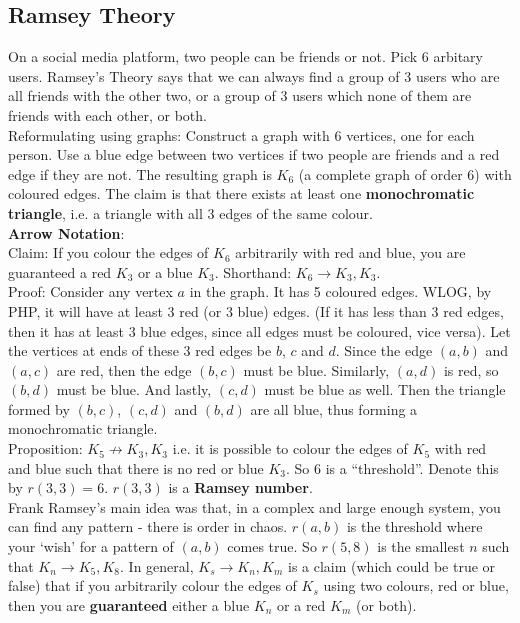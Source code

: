 \documentclass[12pt]{extarticle}
\begin{document}
\subsection*{Ramsey Theory}
On a social media platform, two people can be friends or not. Pick 6 arbitary users. Ramsey's Theory says that we can always find a group of 3 users who are all friends with the other two, or a group of 3 users which none of them are friends with each other, or both. \\
Reformulating using graphs: Construct a graph with 6 vertices, one for each person. Use a blue edge between two vertices if two people are friends and a red edge if they are not. The resulting graph is $K_6$ (a complete graph of order 6) with coloured edges. The claim is that there exists at least one \textbf{monochromatic triangle}, i.e. a triangle with all 3 edges of the same colour.\\
\textbf{Arrow Notation}:\\
Claim: If you colour the edges of $K_6$ arbitrarily with red and blue, you are guaranteed a red $K_3$ or a blue $K_3$. Shorthand: $K_6\to K_3,K_3$. \\
Proof: Consider any vertex $a$ in the graph. It has 5 coloured edges. WLOG, by PHP, it will have at least 3 red (or 3 blue) edges. (If it has less than 3 red edges, then it has at least 3 blue edges, since all edges must be coloured, vice versa). Let the vertices at ends of these 3 red edges be $b$, $c$ and $d$. Since the edge $(a,b)$ and $(a,c)$ are red, then the edge $(b,c)$ must be blue. Similarly, $(a,d)$ is red, so $(b,d)$ must be blue. And lastly, $(c,d)$ must be blue as well. Then the triangle formed by $(b,c)$, $(c,d)$ and $(b,d)$ are all blue, thus forming a monochromatic triangle.\\
Proposition: $K_5\not\rightarrow K_3,K_{3}$ i.e. it is possible to colour the edges of $K_{5}$ with red and blue such that there is no red or blue $K_{3}$. So 6 is a ``threshold''. Denote this by $r(3,3)=6$. $r(3,3)$ is a \textbf{Ramsey number}. \\
Frank Ramsey's main idea was that, in a complex and large enough system, you can find any pattern - there is order in chaos. $r(a,b)$ is the threshold where your `wish' for a pattern of $(a,b)$ comes true. So $r(5,8)$ is the smallest $n$ such that $K_{n}\to K_{5},K_{8}$. In general, $K_{s}\to K_{n},K_{m}$ is a claim (which could be true or false) that if you arbitrarily colour the edges of $K_{s}$ using two colours, red or blue, then you are \textbf{guaranteed} either a blue $K_{n}$ or a red $K_{m}$ (or both). \\
\end{document}
